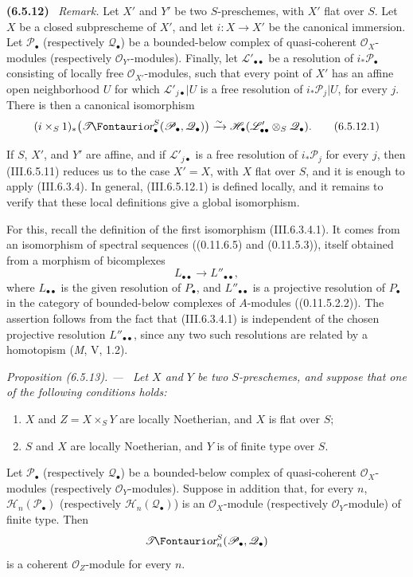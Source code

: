 \documentclass[10pt,oneside]{book}
\newcommand{\sh}[1]{\mathscr{#1}}
\newcommand{\shTor}{\sh{T}\textup{\kern-2.2pt{\Fontauri\slshape or}}}
\newcommand{\sref}[2][]{(#2)}
\newcommand{\oldpage}[2][]{\setcounter{footnote}{0}\marginpar{\scriptsize\textbf{#1}~|~#2}\ignorespaces}
\newenvironment{env}[1][]{\par\medskip\noindent\textbf{(#1)}\ }{\par}
\newenvironment{proposition}[1][]{\par\medskip\noindent\itshape Proposition (#1). ---\ }{\par}
\begin{document}
\begin{env}[6.5.12]
\label{III.6.5.12}
\emph{Remark.}
Let $X'$ and $Y'$ be two $S$-preschemes, with $X'$ flat over
$S$.  Let $X$ be a closed subprescheme of $X'$, and let
$i:X\to X'$ be the canonical immersion.  Let $\sh P_\bullet$
(respectively $\sh Q_\bullet$) be a bounded-below complex of
quasi-coherent $\sh O_X$-modules (respectively
$\sh O_{Y'}$-modules).  Finally, let $\sh L'_{\bullet\bullet}$
be a resolution of $i_*\sh P_\bullet$ consisting of locally free
$\sh O_{X'}$-modules, such that every point of $X'$ has an
affine open neighborhood $U$ for which
$\sh L'_{j\bullet}|U$ is a free resolution of
$i_*\sh P_j|U$, for every $j$.  There is then a canonical
isomorphism
\[
  (i\times_S1)_*
  \bigl(\shTor_\bullet^S(\sh P_\bullet,\sh Q_\bullet)\bigr)
  \xrightarrow{\sim}
  \sh H_\bullet(\sh L'_{\bullet\bullet}\otimes_S\sh Q_\bullet).
  \tag{6.5.12.1}\label{III.6.5.12.1}
\]

If $S$, $X'$, and $Y'$ are affine, and if
$\sh L'_{j\bullet}$ is a free resolution of $i_*\sh P_j$ for
every $j$, then \sref{III.6.5.11} reduces us to the case
$X'=X$, with $X$ flat over $S$, and it is enough to apply
\sref{III.6.3.4}.  In general, \sref{III.6.5.12.1} is defined
locally, and it remains to verify that these local definitions
give a global isomorphism.

For this, recall the definition of the first isomorphism
\sref{III.6.3.4.1}.  It comes from an isomorphism of spectral
sequences (\sref[0]{0.11.6.5} and \sref[0]{0.11.5.3}), itself
obtained from a morphism of bicomplexes
\[
  L_{\bullet\bullet}\longrightarrow L''_{\bullet\bullet},
\]
where $L_{\bullet\bullet}$ is the given resolution of
$P_\bullet$, and
\oldpage[III]{152}
$L''_{\bullet\bullet}$ is a projective resolution of
$P_\bullet$ in the category of bounded-below complexes of
$A$-modules (\sref[0]{0.11.5.2.2}).  The assertion follows from
the fact that \sref{III.6.3.4.1} is independent of the chosen
projective resolution $L''_{\bullet\bullet}$, since any two such
resolutions are related by a homotopism (\emph{M}, V, 1.2).
\end{env}

\begin{proposition}[6.5.13]
\label{III.6.5.13}
Let $X$ and $Y$ be two $S$-preschemes, and suppose that one of
the following conditions holds:
\begin{enumerate}
  \item[(i)] $X$ and $Z=X\times_SY$ are locally Noetherian, and
    $X$ is flat over $S$;
  \item[(ii)] $S$ and $X$ are locally Noetherian, and $Y$ is of
    finite type over $S$.
\end{enumerate}
Let $\sh P_\bullet$ (respectively $\sh Q_\bullet$) be a
bounded-below complex of quasi-coherent $\sh O_X$-modules
(respectively $\sh O_Y$-modules).  Suppose in addition that, for
every $n$, $\sh H_n(\sh P_\bullet)$ (respectively
$\sh H_n(\sh Q_\bullet)$) is an $\sh O_X$-module
(respectively $\sh O_Y$-module) of finite type.  Then
\[
  \shTor_n^S(\sh P_\bullet,\sh Q_\bullet)
\]
is a coherent $\sh O_Z$-module for every $n$.
\end{proposition}
\end{document}
